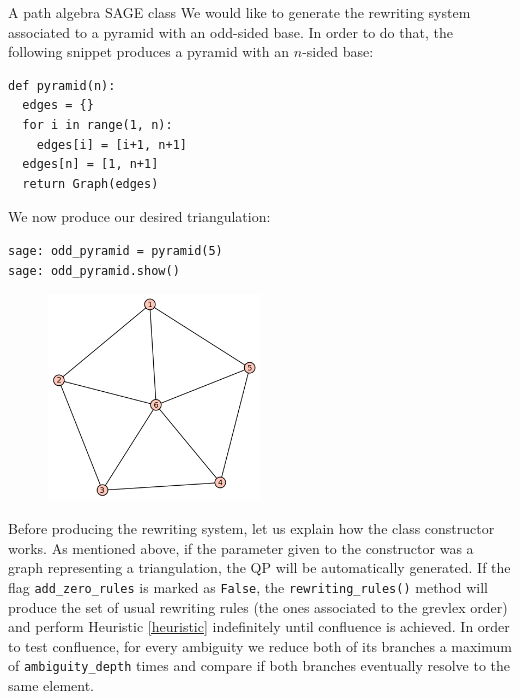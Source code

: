 \begin{chapter}{A path algebra SAGE class}
We would like to generate the rewriting system associated to a pyramid with an odd-sided base. In order to do that, the following snippet produces a pyramid with an $n$-sided base:
\begin{lstlisting}
def pyramid(n):
  edges = {}
  for i in range(1, n):
    edges[i] = [i+1, n+1]
  edges[n] = [1, n+1]
  return Graph(edges)
\end{lstlisting}
We now produce our desired triangulation:
\begin{lstlisting}
sage: odd_pyramid = pyramid(5)
sage: odd_pyramid.show()
\end{lstlisting}
\begin{figure}[h]
\centering
\includegraphics[width=0.5\textwidth]{odd_pyramid.png}
\end{figure}
Before producing the rewriting system, let us explain how the class constructor works. As mentioned above, if the parameter given to the constructor was a graph representing a triangulation, the QP will be automatically generated. If the flag \texttt{add\_zero\_rules} is marked as \texttt{False}, the \texttt{rewriting\_rules()} method will produce the set of usual rewriting rules (the ones associated to the grevlex order) and perform Heuristic \ref{heuristic} indefinitely until confluence is achieved. In order to test confluence, for every ambiguity we reduce both of its branches a maximum of \texttt{ambiguity\_depth} times and compare if both branches eventually resolve to the same element.


\end{chapter}
